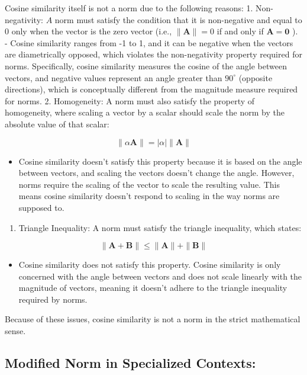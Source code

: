 \documentclass[
  12 pt,
  a4paper,
]{book}
\providecommand{\tightlist}{%
  \setlength{\itemsep}{0pt}\setlength{\parskip}{0pt}}
\numberwithin{equation}{section}
\theoremstyle{plain}      %
\theoremstyle{definition} %
\theoremstyle{remark}     %
\theoremstyle{note}         %
\begin{document}
Cosine similarity itself is not a norm due to the following reasons: 1.
Non-negativity: \(A\) norm must satisfy the condition that it is
non-negative and equal to 0 only when the vector is the zero vector
(i.e., \(\|\mathbf{A}\|=0\) if and only if \(\mathbf{A}=\mathbf{0}\) ).
- Cosine similarity ranges from -1 to 1, and it can be negative when the
vectors are diametrically opposed, which violates the non-negativity
property required for norms. Specifically, cosine similarity measures
the cosine of the angle between vectors, and negative values represent
an angle greater than \(90^{\circ}\) (opposite directions), which is
conceptually different from the magnitude measure required for norms. 2.
Homogeneity: A norm must also satisfy the property of homogeneity, where
scaling a vector by a scalar should scale the norm by the absolute value
of that scalar:

\[
\|\alpha \mathbf{A}\|=|\alpha|\|\mathbf{A}\|
\]

\begin{itemize}
\tightlist
\item
  Cosine similarity doesn't satisfy this property because it is based on
  the angle between vectors, and scaling the vectors doesn't change the
  angle. However, norms require the scaling of the vector to scale the
  resulting value. This means cosine similarity doesn't respond to
  scaling in the way norms are supposed to.
\end{itemize}

\begin{enumerate}
\def\labelenumi{\arabic{enumi}.}
\setcounter{enumi}{2}
\tightlist
\item
  Triangle Inequality: A norm must satisfy the triangle inequality,
  which states:
\end{enumerate}

\[
\|\mathbf{A}+\mathbf{B}\| \leq\|\mathbf{A}\|+\|\mathbf{B}\|
\]

\begin{itemize}
\tightlist
\item
  Cosine similarity does not satisfy this property. Cosine similarity is
  only concerned with the angle between vectors and does not scale
  linearly with the magnitude of vectors, meaning it doesn't adhere to
  the triangle inequality required by norms.
\end{itemize}

Because of these issues, cosine similarity is not a norm in the strict
mathematical sense.

\hypertarget{modified-norm-in-specialized-contexts}{%
\subsection{Modified Norm in Specialized
Contexts:}\label{modified-norm-in-specialized-contexts}}
\end{document}
